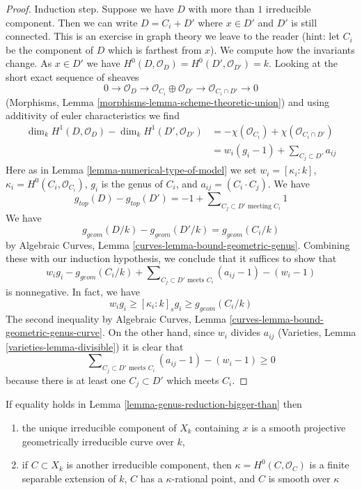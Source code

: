 \begin{proof}
\medskip\noindent
Induction step. Suppose we have $D$ with more than $1$ irreducible
component. Then we can write $D = C_i + D'$ where $x \in D'$ and
$D'$ is still connected. This is an exercise in graph theory we leave
to the reader (hint: let $C_i$ be the component of $D$ which is
farthest from $x$). We compute how the invariants change.
As $x \in D'$ we have $H^0(D, \mathcal{O}_D) = H^0(D', \mathcal{O}_{D'}) = k$.
Looking at the short exact sequence of sheaves
$$
0 \to \mathcal{O}_D \to \mathcal{O}_{C_i} \oplus \mathcal{O}_{D'}
\to \mathcal{O}_{C_i \cap D'} \to 0
$$
(Morphisms, Lemma \ref{morphisms-lemma-scheme-theoretic-union})
and using additivity of euler characteristics we find
\begin{align*}
\dim_k H^1(D, \mathcal{O}_D) - \dim_k H^1(D', \mathcal{O}_{D'})
& =
-\chi(\mathcal{O}_{C_i}) + \chi(\mathcal{O}_{C_i \cap D'}) \\
& =
w_i(g_i - 1) + \sum\nolimits_{C_j \subset D'} a_{ij}
\end{align*}
Here as in Lemma \ref{lemma-numerical-type-of-model} we set
$w_i = [\kappa_i : k]$, $\kappa_i = H^0(C_i, \mathcal{O}_{C_i})$,
$g_i$ is the genus of $C_i$, and $a_{ij} = (C_i \cdot C_j)$.
We have
$$
g_{top}(D) - g_{top}(D') = -1 +
\sum\nolimits_{C_j \subset D'\text{ meeting }C_i} 1
$$
We have
$$
g_{geom}(D/k) - g_{geom}(D'/k) = g_{geom}(C_i/k)
$$
by Algebraic Curves, Lemma \ref{curves-lemma-bound-geometric-genus}.
Combining these with our induction hypothesis, we
conclude that it suffices to show that
$$
w_i g_i - g_{geom}(C_i/k) +
\sum\nolimits_{C_j \subset D'\text{ meets } C_i} (a_{ij} - 1) - (w_i - 1)
$$
is nonnegative. In fact, we have
\begin{equation}
\label{equation-genus-change}
w_i g_i \geq [\kappa_i : k]_s g_i \geq g_{geom}(C_i/k)
\end{equation}
The second inequality by
Algebraic Curves, Lemma \ref{curves-lemma-bound-geometric-genus-curve}.
On the other hand, since $w_i$ divides $a_{ij}$
(Varieties, Lemma \ref{varieties-lemma-divisible})
it is clear that
\begin{equation}
\label{equation-change-intersections}
\sum\nolimits_{C_j \subset D'\text{ meets } C_i} (a_{ij} - 1) - (w_i - 1)
\geq 0
\end{equation}
because there is at least one $C_j \subset D'$ which meets $C_i$.
\end{proof}

\begin{lemma}
\label{lemma-equality-genus-reduction-bigger-than}
If equality holds in Lemma \ref{lemma-genus-reduction-bigger-than}
then
\begin{enumerate}
\item the unique irreducible component of $X_k$ containing
$x$ is a smooth projective geometrically irreducible curve
over $k$,
\item if $C \subset X_k$ is another irreducible component, then
$\kappa = H^0(C, \mathcal{O}_C)$ is a finite separable extension
of $k$, $C$ has a $\kappa$-rational point, and $C$ is smooth over $\kappa$
\end{enumerate}
\end{lemma}

